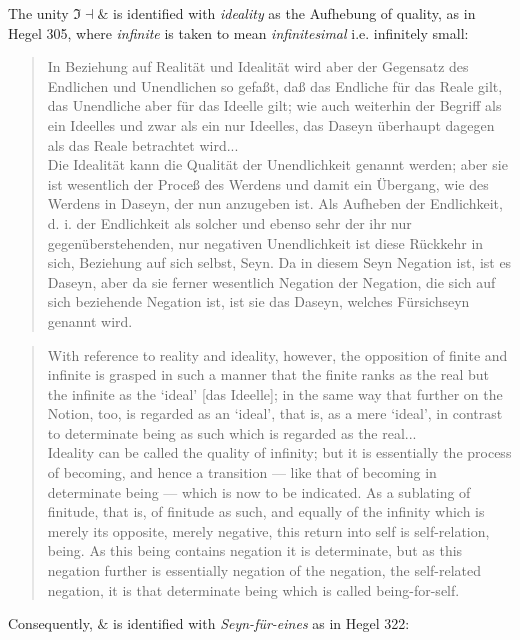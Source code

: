 \documentclass{article}
\begin{document}
The unity $\Im\dashv\&$ is identified with \emph{ideality} as the Aufhebung of quality, as in Hegel 305,
where \emph{infinite} is taken to mean \emph{infinitesimal} i.e. infinitely small:

\begin{quote}
    In Beziehung auf Realität und Idealität wird aber der Gegensatz des Endlichen und Unendlichen so gefaßt,
daß das Endliche für das Reale gilt, das Unendliche aber für das Ideelle gilt; wie auch weiterhin der
Begriff als ein Ideelles und zwar als ein nur Ideelles, das Daseyn überhaupt dagegen als das Reale betrachtet
wird... \\

    Die Idealität kann die Qualität der Unendlichkeit genannt werden; aber sie ist wesentlich der Proceß
des Werdens und damit ein Übergang, wie des Werdens in Daseyn, der nun anzugeben ist. Als Aufheben der
Endlichkeit, d. i. der Endlichkeit als solcher und ebenso sehr der ihr nur gegenüberstehenden, nur negativen
Unendlichkeit ist diese Rückkehr in sich, Beziehung auf sich selbst, Seyn. Da in diesem Seyn Negation
ist, ist es Daseyn, aber da sie ferner wesentlich Negation der Negation, die sich auf sich beziehende
Negation ist, ist sie das Daseyn, welches Fürsichseyn genannt wird.
\end{quote}

\begin{quote}
    With reference to reality and ideality, however, the opposition of finite and infinite is grasped
in such a manner that the finite ranks as the real but the infinite as the ‘ideal’ [das Ideelle]; in the
same way that further on the Notion, too, is regarded as an ‘ideal’, that is, as a mere ‘ideal’, in contrast
to determinate being as such which is regarded as the real... \\
    
    Ideality can be called the quality of infinity; but it is essentially the process of becoming, and
hence a transition — like that of becoming in determinate being — which is now to be indicated. As a sublating
of finitude, that is, of finitude as such, and equally of the infinity which is merely its opposite, merely
negative, this return into self is self-relation, being. As this being contains negation it is determinate,
but as this negation further is essentially negation of the negation, the self-related negation, it is
that determinate being which is called being-for-self.
\end{quote}

Consequently, $\&$ is identified with \emph{Seyn-für-eines} as in Hegel 322:
\end{document}

